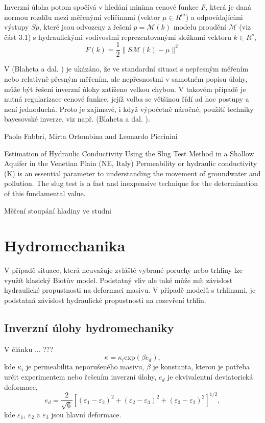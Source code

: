 \documentclass[a4paper]{article}
\newcommand{\alert}[1]{{\color{red}#1}}
\begin{document}
Inverzní úloha potom spočívá v hledání minima cenové funkce $F$, která je
daná normou rozdílu mezi měřenými veličinami (vektor $\mu \in R^m$) a odpovídajícími
výstupy $Sp$, které jsou odvozeny z řešení $p = \mathcal{M}(k)$ modelu proudění $\mathcal{M}$
(viz část 3.1) s hydraulickými vodivostmi reprezentovanými složkami vektoru
$k \in R^s$,
$$
	F(k) = \frac{1}{2}\|S \mathcal{M} (k) - \mu\|^2
$$

V (Blaheta a dal. \cite{15}) je ukázáno, že ve standardní situaci s nepřesným
měřením nebo relativně přesným měřením, ale nepřesnostmi v samotném
popisu úlohy, může být řešení inverzní úlohy zatíženo velkou chybou. V
takovém případě je nutná regularizace cenové funkce, jejíž volba se většinou
řídí ad hoc postupy a není jednoduchá. Proto je zajímavé, i když výpočetně
náročné, použití techniky bayesovské inverze, viz např. (Blaheta a dal. \cite{15,16}).

Paolo Fabbri, Mirta Ortombina and Leonardo Piccinini

Estimation of Hydraulic Conductivity Using the Slug Test Method in a
Shallow Aquifer in the Venetian Plain (NE, Italy) Permeability or hydraulic
conductivity (K) is an essential parameter to understanding the movement of
groundwater and pollution. The slug test is a fast and inexpensive technique
for the determination of this fundamental value.

Měření stoupání hladiny ve studni

\section{Hydromechanika}
V případě situace, která neuvažuje zvláště vybrané poruchy nebo trhliny lze
využít klasický Biotův model. Podstatný vliv ale také může mít závislost hydraulické propustnosti na deformaci masivu. V případě modelů s trhlinami,
je podstatná závislost hydraulické propustnosti na rozevření trhlin.

\cite{16,30,29,31,32}


\subsection{Inverzní úlohy hydromechaniky}

V článku ... \alert{???}
$$
	\kappa = \kappa_i \mbox{exp}(\beta e_d),
$$
kde $\kappa_i$ je permeabilita neporušeného masivu, $\beta$ je konstanta, kterou je
potřeba určit experimentem nebo řešením inverzní úlohy, $e_d$ je ekvivalentní
deviatorická deformace,
$$
	e_d = \frac{2}{\sqrt{6}}[(\varepsilon_1 - \varepsilon_2)^2 + (\varepsilon_2 - \varepsilon_3)^2 + (\varepsilon_3 - \varepsilon_2)^2]^{1/2},
$$
kde $\varepsilon_1$, $\varepsilon_2$ a $\varepsilon_3$ jsou hlavní deformace.
\end{document}
